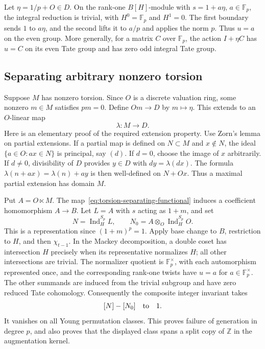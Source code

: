 Let $\eta=1/p+O\in D$.  On the rank-one $B[H]$-module with
$s=1+a\eta$, $a\in\mathbb F_p$, the integral reduction is trivial,
with $H^0=\mathbb F_p$ and $H^1=0$.  The first boundary sends $1$ to
$a\eta$, and the second lifts it to $a/p$ and applies the norm $p$.
Thus $u=a$ on the even group.  More generally, for a matrix $C$ over
$\mathbb F_p$, the action $I+\eta C$ has $u=C$ on its even Tate
group and has zero odd integral Tate group.

\subsection{Separating arbitrary nonzero torsion}

Suppose $M$ has nonzero torsion.  Since $O$ is a discrete valuation
ring, some nonzero $m\in M$ satisfies $pm=0$.  Define
$Om\to D$ by $m\mapsto\eta$.  This extends to an $O$-linear map
\begin{equation}\label{eq:torsion-separating-functional}
 \lambda:M\longrightarrow D.
\end{equation}
Here is an elementary proof of the required extension property.
Use Zorn's lemma on partial extensions.  If a partial map is
defined on $N\subset M$ and $x\notin N$, the ideal
$\{a\in O:ax\in N\}$ is principal, say $(d)$.  If $d=0$, choose
the image of $x$ arbitrarily.  If $d\ne0$, divisibility of $D$
provides $y\in D$ with $dy=\lambda(dx)$.  The formula
$\lambda(n+ax)=\lambda(n)+ay$ is then well-defined on $N+Ox$.
Thus a maximal partial extension has domain $M$.

Put $A=O\ltimes M$.  The map~\eqref{eq:torsion-separating-functional}
induces a coefficient homomorphism $A\to B$.  Let $L=A$ with
$s$ acting as $1+m$, and set
\[
 N=\operatorname{Ind}_{H}^{S_p}L,\qquad
 N_0=A\otimes_O\operatorname{Ind}_{H}^{S_p}O.
\]
This is a representation since $(1+m)^p=1$.
Apply base change to $B$, restriction to $H$, and then
$\chi_{t-1}$.  In the Mackey decomposition, a double coset has
intersection $H$ precisely when its representative normalizes
$H$; all other intersections are trivial.  The normalizer quotient
is $\mathbb F_p^\times$, with each automorphism represented once,
and the corresponding rank-one twists have $u=a$ for
$a\in\mathbb F_p^\times$.  The other summands are induced from
the trivial subgroup and have zero reduced Tate cohomology.
Consequently the composite integer invariant takes
\[
 [N]-[N_0]\quad\hbox{to}\quad1.
\]
It vanishes on all Young permutation classes.  This proves failure
of generation in degree $p$, and also proves that the displayed
class spans a split copy of $\mathbb Z$ in the augmentation kernel.

